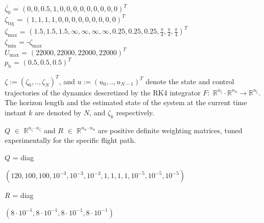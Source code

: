 \documentclass[conference]{IEEEtran}
\begin{document}
\begin{flushleft}
$\bar{\zeta_0}$ \hspace{0.18in}= $(0, 0, 0.5, 1, 0, 0, 0, 0, 0, 0, 0, 0, 0)^T$\\
$\zeta_{\mathrm{trg}}$ \hspace{0.08in}= $( 1, 1, 1, 1, 0, 0, 0, 0, 0, 0, 0, 0, 0)^T$\\
$\zeta_{\mathrm{max}}$ \hspace{0.03in}= $(1.5,1.5,1.5,\infty,\infty,\infty,\infty,0.25,0.25,0.25,\frac{\pi}{4},\frac{\pi}{4},\frac{\pi}{4})^T$\\
$\zeta_{\mathrm{min}}$ \hspace{0.05in}= -$\zeta_{\mathrm{max}}$\\
$U_{\mathrm{max}}$ = $(22000, 22000, 22000, 22000)^T$\\
$p_\mathrm{b}$ \hspace{0.18in}= $(0.5, 0.5, 0.5)^T$\\
\end{flushleft}

 $\zeta := (\zeta_0, .., \zeta_N)^T$, and $u := (u_0, .., u_{N-1})^T$ denote the state and control trajectories of the dynamics descretized by the RK4 integrator $F :$ $\mathbb{R}^{n_{\zeta}} \cdot \mathbb{R}^{n_{u}} \rightarrow \mathbb{R}^{n_{\zeta}}$. The horizon length and the estimated state of the system at the current time instant $k$ are denoted by $N$, and $\zeta_k$ respectively.

 $Q$ $\in$ $\mathbb{R}^{n_{\zeta} \cdot n_{\zeta}}$ and $R$ $\in$ $\mathbb{R}^{n_{u} \cdot n_{u}}$ are positive definite weighting matrices, tuned experimentally for the specific flight path.
\begin{flushleft}
\begin{small}
$Q$ = diag\begin{footnotesize}$(120, 100, 100, 10^{-3}, 10^{-3},10^{-3},1, 1, 1, 1, 10^{-5}, 10^{-5}, 10^{-5})$\\
\end{footnotesize}
$R$ = diag\begin{footnotesize}$(8 \cdot 10^{-1}, 8\cdot 10^{-1}, 8\cdot 10^{-1}, 8\cdot 10^{-1})$\\
\end{footnotesize}
\end{small}
\end{flushleft}

\end{document}
